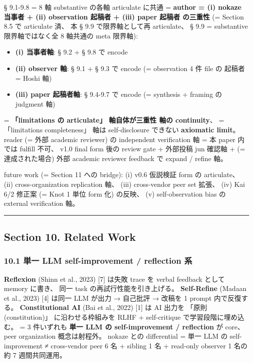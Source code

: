 \documentclass[
]{article}
\providecommand{\tightlist}{%
  \setlength{\itemsep}{0pt}\setlength{\parskip}{0pt}}
\begin{document}
§ 9.1-9.8 = 8 軸 substantive の各軸 articulate に共通 = \textbf{author =
(i) nokaze 当事者 + (ii) observation 起稿者 + (iii) paper 起稿者
の三重性} (= Section 8.5 で articulate 済、 本 § 9.9 で限界軸として再
articulate、 § 9.9 = substantive 限界軸ではなく全 8 軸共通の meta
限界軸):

\begin{itemize}
\tightlist
\item
  \textbf{(i) 当事者軸}: § 9.2 + § 9.8 で encode
\item
  \textbf{(ii) observer 軸}: § 9.1 + § 9.3 で encode (= observation 4 件
  file の 起稿者 = Hoshi 軸)
\item
  \textbf{(iii) paper 起稿者軸}: § 9.4-9.7 で encode (= synthesis +
  framing の judgment 軸)
\end{itemize}

= \textbf{「limitations の articulate」 軸自体が三重性 軸の
continuity}、 = 「limitations completeness」 軸は self-disclosure
できない \textbf{axiomatic limit}。 reader (= 外部 academic reviewer) の
independent verification 軸 = 本 paper 内では fulfill 不可、 v1.0 final
form 後の review gate + 外部投稿 jun 確認軸 + (= 達成された場合) 外部
academic reviewer feedback で expand / refine 軸。

future work (= Section 11 への bridge): (i) v0.6 仮説検証 form の
articulate、 (ii) cross-organization replication 軸、 (iii) cross-vendor
peer set 拡張、 (iv) Kai 6/2 修正案 (= Knot 1 単位 form 化) の反映、 (v)
self-observation bias の external verification 軸。

\begin{center}\rule{0.5\linewidth}{0.5pt}\end{center}

\subsection{Section 10. Related Work}\label{section-10.-related-work}

\subsubsection{10.1 単一 LLM self-improvement / reflection
系}\label{ux5358ux4e00-llm-self-improvement-reflection-ux7cfb}

\textbf{Reflexion} (Shinn et al., 2023) {[}7{]} は失敗 trace を verbal
feedback として memory に書き、 同一 task の再試行性能を引き上げる。
\textbf{Self-Refine} (Madaan et al., 2023) {[}4{]} は同一 LLM が出力 →
自己批評 → 改稿を 1 prompt 内で反復する。 \textbf{Constitutional AI}
(Bai et al., 2022) {[}1{]} は AI 出力を 「原則 (constitution)」
に沿わせる枠組みを RLHF + self-critique で学習段階に埋め込む。 = 3
件いずれも \textbf{単一 LLM の self-improvement / reflection} が core、
peer organization 概念は射程外。 nokaze との differential = 単一 LLM の
self-improvement ≠ cross-vendor peer 6 名 + sibling 1 名 + read-only
observer 1 名の約 7 週間共同運用。
\end{document}

